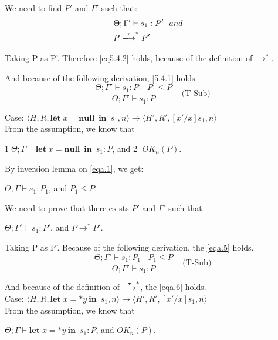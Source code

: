 \documentclass[english]{jssst_ppl} %
\newcommand\LET{\mathbf{let}\;}
\newcommand\IN{\mathbf{in}\;}
\newcommand\Rtab{\; \; \; \;}
\newcommand\NULL{\mathbf{null}\;}
\theoremstyle{definition}
\begin{document}
We need to find $P'$ and $\Gamma'$ such that:
\begin{align}
  &\Theta; \Gamma' \vdash s_{1} : P' \ \ and& \label{eq5.4.1}\\
  &P \xlongrightarrow{\tau}^{*} P'& \label{eq5.4.2}
\end{align}

Taking P as P'. Therefore \eqref{eq5.4.2} holds, because of the definition of $\rightarrow^{*}$.

And because of the following derivation, \eqref{5.4.1} holds.
$$
  \frac{\Theta; \Gamma' \vdash s_{1} : P_{1} \ \ \ P_{1} \le P}
  {\Theta; \Gamma' \vdash s_{1} : P}
  \Rtab \mbox{(T-Sub)}
$$

\noindent Case: $\langle H, R, \LET x = \NULL \  \IN \  s_{1}, n \rangle \rightarrow \langle H', R', [x'/x]s_{1}, n \rangle $\\

From the assumption, we know that
\begin{center}
\textcircled{1}$\Theta; \Gamma \vdash \LET x = \NULL \  \IN \ s_{1} : P$, and \textcircled{2} $OK_{n}(P)$.
\end{center}

By inversion lemma on \eqref{eqa.1}, we get:
\begin{center}
$\Theta; \Gamma \vdash s_{1} : P_{1}$, and $ P_{1} \le P$.
\end{center}

We need to prove that there exists $P'$ and $\Gamma'$ such that
\begin{center}
$\Theta; \Gamma' \vdash s_{1} : P'$, and $P \rightarrow^{*} P'$.
\end{center}

Taking P as P'. Because of the following derivation, the \eqref{eqa.5} holds.
$$
  \frac{\Theta; \Gamma' \vdash s_{1} : P_{1} \ \ \ \ P_{1} \le P}
  {\Theta; \Gamma' \vdash s_{1} : P}
  \Rtab \mbox{(T-Sub)}
$$

And because of the definition of $\xlongrightarrow{\tau}^{*}$, the \eqref{eqa.6} holds. \\

\noindent Case: $\langle H, R, \LET x = *y \  \IN \  s_{1}, n \rangle \rightarrow \langle H', R', [x'/x]s_{1}, n \rangle $\\

From the assumption, we know that
\begin{center}
$\Theta; \Gamma \vdash \LET x = *y \  \IN \  s_{1} : P$, and $OK_{n}(P)$.
\end{center}
\end{document}
